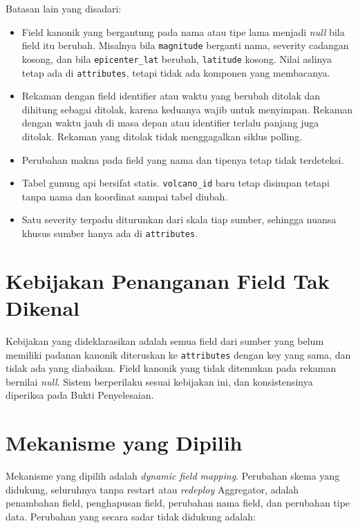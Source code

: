 Batasan lain yang disadari:

\begin{itemize}
\tightlist
\item
  Field kanonik yang bergantung pada nama atau tipe lama menjadi \textit{null} bila field itu berubah. Misalnya bila \texttt{magnitude} berganti nama, severity cadangan kosong, dan bila \texttt{epicenter\_lat} berubah, \texttt{latitude} kosong. Nilai aslinya tetap ada di \texttt{attributes}, tetapi tidak ada komponen yang membacanya.
\item
  Rekaman dengan field identifier atau waktu yang berubah ditolak dan dihitung sebagai ditolak, karena keduanya wajib untuk menyimpan. Rekaman dengan waktu jauh di masa depan atau identifier terlalu panjang juga ditolak. Rekaman yang ditolak tidak menggagalkan siklus polling.
\item
  Perubahan makna pada field yang nama dan tipenya tetap tidak terdeteksi.
\item
  Tabel gunung api bersifat statis. \texttt{volcano\_id} baru tetap disimpan tetapi tanpa nama dan koordinat sampai tabel diubah.
\item
  Satu severity terpadu diturunkan dari skala tiap sumber, sehingga nuansa khusus sumber hanya ada di \texttt{attributes}.
\end{itemize}

\section{Kebijakan Penanganan Field Tak Dikenal}

Kebijakan yang dideklarasikan adalah semua field dari sumber yang belum memiliki padanan kanonik diteruskan ke \texttt{attributes} dengan key yang sama, dan tidak ada yang diabaikan. Field kanonik yang tidak ditemukan pada rekaman bernilai \textit{null}. Sistem berperilaku sesuai kebijakan ini, dan konsistensinya diperiksa pada Bukti Penyelesaian.

\section{Mekanisme yang Dipilih}

Mekanisme yang dipilih adalah \textit{dynamic field mapping}. Perubahan skema yang didukung, seluruhnya tanpa restart atau \textit{redeploy} Aggregator, adalah penambahan field, penghapusan field, perubahan nama field, dan perubahan tipe data. Perubahan yang secara sadar tidak didukung adalah:

